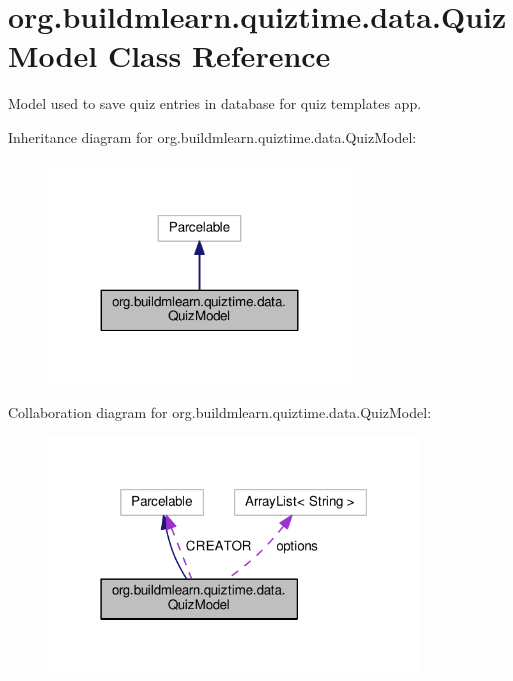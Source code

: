 \hypertarget{classorg_1_1buildmlearn_1_1quiztime_1_1data_1_1QuizModel}{}\section{org.\+buildmlearn.\+quiztime.\+data.\+Quiz\+Model Class Reference}
\label{classorg_1_1buildmlearn_1_1quiztime_1_1data_1_1QuizModel}


Model used to save quiz entries in database for quiz template\textquotesingle{}s app.  




Inheritance diagram for org.\+buildmlearn.\+quiztime.\+data.\+Quiz\+Model\+:
\nopagebreak
\begin{figure}[H]
\begin{center}
\leavevmode
\includegraphics[width=227pt]{classorg_1_1buildmlearn_1_1quiztime_1_1data_1_1QuizModel__inherit__graph}
\end{center}
\end{figure}


Collaboration diagram for org.\+buildmlearn.\+quiztime.\+data.\+Quiz\+Model\+:
\nopagebreak
\begin{figure}[H]
\begin{center}
\leavevmode
\includegraphics[width=279pt]{classorg_1_1buildmlearn_1_1quiztime_1_1data_1_1QuizModel__coll__graph}
\end{center}
\end{figure}
